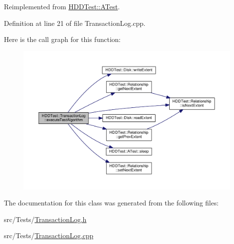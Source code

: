 Reimplemented from \hyperlink{class_h_d_d_test_1_1_a_test_a7dc054e211eccf42c03a6bb31d7fdc6e}{H\-D\-D\-Test\-::\-A\-Test}.



Definition at line 21 of file Transaction\-Log.\-cpp.



Here is the call graph for this function\-:
\nopagebreak
\begin{figure}[H]
\begin{center}
\leavevmode
\includegraphics[width=350pt]{class_h_d_d_test_1_1_transaction_log_a3454c7970a87effe1f5154e7bcd73273_cgraph}
\end{center}
\end{figure}




The documentation for this class was generated from the following files\-:\begin{DoxyCompactItemize}
\item 
src/\-Tests/\hyperlink{_transaction_log_8h}{Transaction\-Log.\-h}\item 
src/\-Tests/\hyperlink{_transaction_log_8cpp}{Transaction\-Log.\-cpp}\end{DoxyCompactItemize}
